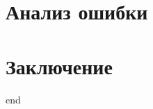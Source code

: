\documentclass[12pt,twoside]{article}
\begin{document}
\section{Анализ ошибки}

\section{Заключение}
end









\end{document}

